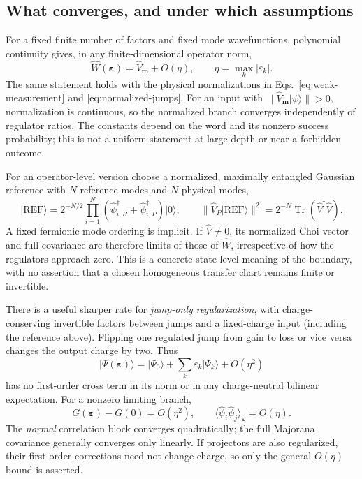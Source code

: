 \documentclass[aps,prb,onecolumn,nofootinbib,superscriptaddress]{revtex4-2}
\newcommand{\Tr}{\operatorname{Tr}}
\newcommand{\ket}[1]{\lvert #1\rangle}
\newcommand{\eps}{\varepsilon}
\begin{document}
\subsection{What converges, and under which assumptions}
For a fixed finite number of factors and fixed mode wavefunctions,
polynomial continuity gives, in any finite-dimensional operator norm,
\begin{equation}
 \hat W(\bm\eps)=\hat V_{\boldsymbol m}+O(\eta),\qquad
 \eta=\max_k|\eps_k|.
 \label{eq:word-convergence}
\end{equation}
The same statement holds with the physical normalizations in
Eqs.~\eqref{eq:weak-measurement} and \eqref{eq:normalized-jumps}.
For an input with $\|\hat V_{\boldsymbol m}\ket{\psi}\|>0$, normalization
is continuous, so the normalized branch converges independently of
regulator ratios. The constants depend on the word and its nonzero
success probability; this is not a uniform statement at large depth or
near a forbidden outcome.

For an operator-level version choose a normalized, maximally entangled
Gaussian reference with $N$ reference modes and $N$ physical modes,
\begin{equation}
 \ket{\mathrm{REF}}=2^{-N/2}\prod_{i=1}^N
 (\hat\psi_{i,R}^\dagger+\hat\psi_{i,P}^\dagger)\ket{0},\qquad
 \|\hat V_P\ket{\mathrm{REF}}\|^2=2^{-N}\Tr(\hat V^\dagger\hat V).
 \label{eq:choi-reference}
\end{equation}
A fixed fermionic mode ordering is implicit. If $\hat V\ne0$, its
normalized Choi vector and full covariance are therefore limits of those
of $\hat W$, irrespective of how the regulators approach zero. This is
a concrete state-level meaning of the boundary, with no assertion that
a chosen homogeneous transfer chart remains finite or invertible.

There is a useful sharper rate for \emph{jump-only regularization}, with
charge-conserving invertible factors between jumps and a fixed-charge
input (including the reference above). Flipping one regulated jump from
gain to loss or vice versa changes the output charge by two. Thus
\begin{equation}
 \ket{\Psi(\bm\eps)}=\ket{\Psi_0}
       +\sum_k\eps_k\ket{\Psi_k}+O(\eta^2)
\end{equation}
has no first-order cross term in its norm or in any charge-neutral
bilinear expectation. For a nonzero limiting branch,
\begin{equation}
 G(\bm\eps)-G(0)=O(\eta^2),\qquad
 \langle\hat\psi_i\hat\psi_j\rangle_{\bm\eps}=O(\eta).
 \label{eq:rates}
\end{equation}
The \emph{normal} correlation block converges quadratically; the full
Majorana covariance generally converges only linearly. If projectors are
also regularized, their first-order corrections need not change charge,
so only the general $O(\eta)$ bound is asserted.
\end{document}

